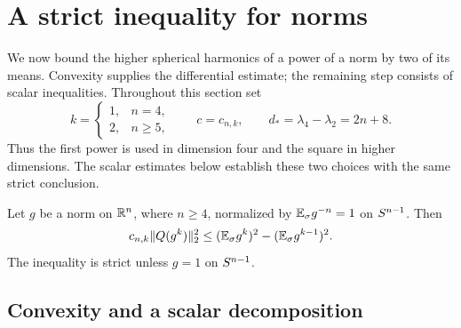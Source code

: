 \section{A strict inequality for norms}\label{sec:norm}

We now bound the higher spherical harmonics of a power of a norm by two
of its means.  Convexity supplies the differential estimate; the remaining
step consists of scalar inequalities.  Throughout this section set
\begin{equation}\label{eq:k-choice}
 k=\begin{cases}1,&n=4,\\2,&n\ge5,\end{cases}
 \qquad c=c_{n,k},\qquad d_* =\lambda_4-\lambda_2=2n+8.
\end{equation}
Thus the first power is used in dimension four and the square in higher
dimensions.  The scalar estimates below establish these two choices with
the same strict conclusion.

\begin{theorem}\label{thm:norm-estimate}
Let $g$ be a norm on $\mathbb R^n$, where $n\ge4$, normalized by
$\mathbb E_{\sigma} g^{-n}=1$ on $S^{n-1}$.  Then
\begin{equation}\label{eq:norm-estimate}
 c_{n,k}\|Q(g^k)\|_2^2
 \le (\mathbb E_{\sigma} g^k)^2-(\mathbb E_{\sigma} g^{k-1})^2.
\end{equation}
The inequality is strict unless $g=1$ on $S^{n-1}$.
\end{theorem}

\subsection{Convexity and a scalar decomposition}

